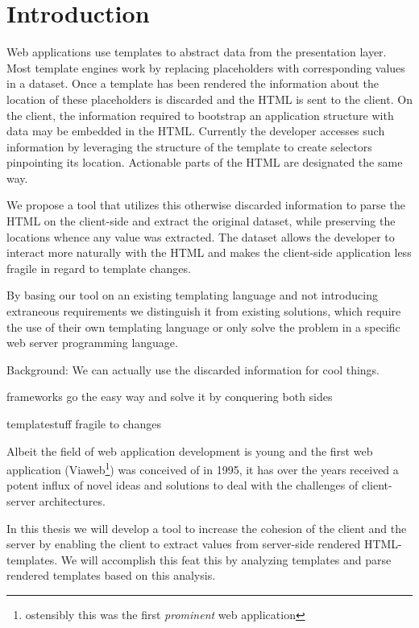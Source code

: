 \documentclass[thesis.tex]{subfiles}
\begin{document}
\chapter{Introduction}
\label{chap:intro}
Web applications use templates to abstract data from the presentation layer.
Most template engines work by replacing placeholders with corresponding values
in a dataset.
Once a template has been rendered the information about the location of these
placeholders is discarded and the HTML is sent to the client.
On the client, the information required to bootstrap an application structure
with data may be embedded in the HTML. Currently the developer accesses such
information by leveraging the structure of the template to create selectors
pinpointing its location. Actionable parts of the HTML are designated the same
way.

We propose a tool that utilizes this otherwise discarded information to parse
the HTML on the client-side and extract the original dataset, while preserving
the locations whence any value was extracted. The dataset allows the developer
to interact more naturally with the HTML and makes the client-side application
less fragile in regard to template changes.

By basing our tool on an existing templating language and not introducing
extraneous requirements we distinguish it from existing solutions,
which require the use of their own templating language or only solve the problem
in a specific web server programming language.


Background: We can actually use the discarded information for cool things.

frameworks go the easy way and solve it by conquering both sides

templatestuff fragile to changes

Albeit the field of web application development is young and the first web
application (Viaweb\footnote{ostensibly this was the
first \emph{prominent} web application }) was conceived of in 1995,
it has over the years received a potent influx of novel ideas and solutions
to deal with the challenges of client-server architectures.


In this thesis we will develop a tool to increase the cohesion of the client and
the server by enabling the client to extract values from server-side rendered
HTML-templates. We will accomplish this feat this by analyzing templates and
parse rendered templates based on this analysis.
\end{document}
